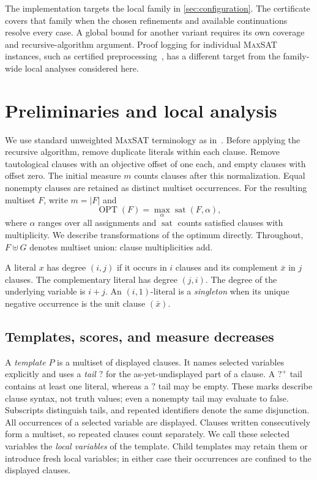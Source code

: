\documentclass[10pt,twoside]{article}
\newcommand{\MaxSAT}{\textnormal{\textsc{MaxSAT}}}
\newcommand{\OPT}{\operatorname{OPT}}
\newcommand{\anytail}{\mathord{?}}
\newcommand{\plustail}{\mathord{?}^{+}}
\theoremstyle{definition}
\theoremstyle{remark}
\begin{document}
The implementation targets the local family in \cref{sec:configuration}.
The certificate covers that family when the chosen refinements and available
continuations resolve every case. A global bound for another variant
requires its own coverage and recursive-algorithm argument. Proof logging for
individual \MaxSAT{} instances, such as certified
preprocessing~\cite{IhalainenEtAl2024}, has a different target from the
family-wide local analyses considered here.

\section{Preliminaries and local analysis}
\label{sec:preliminaries}

We use standard unweighted \MaxSAT{} terminology as in~\cite{Xiao2022}.
Before applying the recursive algorithm, remove duplicate literals within
each clause. Remove tautological clauses with an objective offset of one
each, and empty clauses with offset zero. The initial measure $m$ counts
clauses after this normalization. Equal nonempty clauses are retained as
distinct multiset occurrences.
For the resulting multiset $F$, write $m=|F|$ and
\[
  \OPT(F)=\max_{\alpha}\operatorname{sat}(F,\alpha),
\]
where $\alpha$ ranges over all assignments and $\operatorname{sat}$ counts
satisfied clauses with multiplicity. We describe transformations of the
optimum directly.
Throughout, $F\uplus G$ denotes multiset union: clause multiplicities add.

A literal $x$ has degree $(i,j)$ if it occurs in $i$ clauses and its complement
$\bar x$ in $j$ clauses. The complementary literal has degree $(j,i)$.
The degree of the underlying variable is $i+j$.
An $(i,1)$-literal is a \emph{singleton} when its unique
negative occurrence is the unit clause $(\bar x)$.

\subsection{Templates, scores, and measure decreases}
\label{sec:local-notation}

A \emph{template} $P$ is a multiset of displayed clauses. It names selected
variables explicitly and uses a \emph{tail} $\anytail$ for the as-yet-undisplayed
part of a clause. A $\plustail$ tail contains at least one literal, whereas a $\anytail$ tail
may be empty. These marks describe clause syntax, not truth values; even a
nonempty tail may evaluate to false. Subscripts distinguish tails, and repeated
identifiers denote the same disjunction. All occurrences of a selected
variable are displayed. Clauses written consecutively form a multiset, so
repeated clauses count separately.
We call these selected variables the \emph{local variables} of the template.
Child templates may retain them or introduce fresh local variables; in either
case their occurrences are confined to the displayed clauses.
\end{document}
